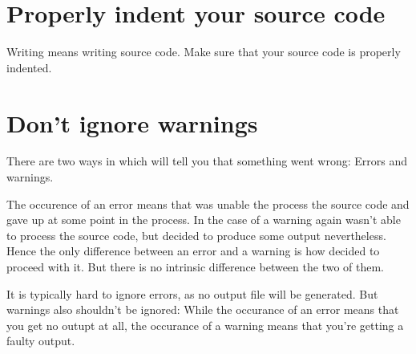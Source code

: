 \section{Properly indent your source code}

Writing  means writing source code.
Make sure that your source code is properly indented.





\section{Don’t ignore warnings}

There are two ways in which  will tell you that something went wrong:
Errors and warnings.

The occurence of an error means that  was unable the process the source code and gave up at some point in the process.
In the case of a warning  again wasn’t able to process the source code, but decided to produce some output nevertheless.
Hence the only difference between an error and a warning is how  decided to proceed with it.
But there is no intrinsic difference between the two of them.

It is typically hard to ignore errors, as no output file will be generated.
But warnings also shouldn’t be ignored:
While the occurance of an error means that you get no outupt at all, the occurance of a warning means that you’re getting a faulty output.

